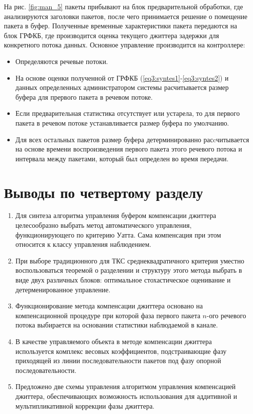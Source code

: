 На рис. \ref{fig:man_5} пакеты прибывают на блок предварительной обработки, где анализируются заголовки пакетов, после чего принимается решение о помещение пакета в буфер.
Полученные временные характеристики пакета передаются на блок ГРФКБ, где производится оценка текущего джиттера задержки для конкретного потока данных.
Основное управление производится на контроллере: 
\begin{itemize}
 \item Определяются речевые потоки.
 \item На основе оценки полученной от ГРФКБ (\ref{eq3:syntes1}-\ref{eq3:syntes2}) и данных определенных администратором системы расчитывается размер буфера для прервого пакета в речевом потоке.
 \item Если предварительная статистика отсутствует или устарела, то для первого пакета в речевом потоке устанавливается размер буфера по умолчанию.
 \item Для всех остальных пакетов размер буфера детерминированно расcчитывается на основе времени воспроизведения первого пакета этого речевого потока и интервала между пакетами, который был определен во время передачи.
\end{itemize}


\section{Выводы по четвертому разделу}
\begin{enumerate}
 \item Для синтеза алгоритма управления буфером компенсации джиттера целесообразно выбрать метод автоматического управления, функционирующего по критерию Уатта. 
 Сама компенсация при этом относится к классу управления наблюдением.
 \item При выборе традиционного для ТКС среднеквадратичного критерия уместно воспользоваться теоремой о разделении и структуру этого метода выбрать в виде двух различных блоков: оптимальное стохастическое оценивание и детерменированное управление.
 \item Функционирование метода компенсации джиттера основано на компенсационной процедуре при которой фаза первого пакета $n$-ого речевого потока выбирается на основании статистики наблюдаемой в канале.
 \item В качестве управляемого объекта в методе компенсации джиттера используется комплекс весовых коэффициентов, подстраивающие фазу приходящей из линии последовательности пакетов под фазу опорной последовательности.
 \item Предложено две схемы управления алгоритмом управления компенсацией джиттера, обеспечивающих возможность использования для аддитивной и мультипликативной коррекции фазы джиттера.
\end{enumerate}
